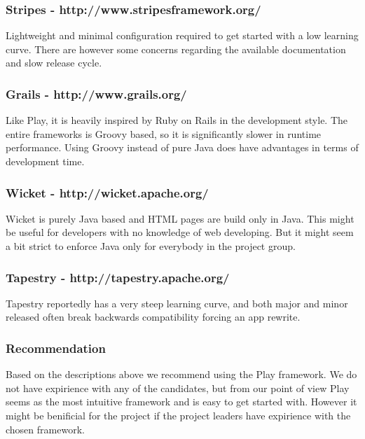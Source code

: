 \documentclass{acm_proc_article-sp}
\begin{document}
\subsubsection*{Stripes - http://www.stripesframework.org/}

Lightweight and minimal configuration required to get started with a low learning curve. There are however some concerns regarding the available documentation and slow release cycle.

\subsubsection*{Grails - http://www.grails.org/}

Like Play, it is heavily inspired by Ruby on Rails in the development style. The entire frameworks is Groovy based, so it is significantly slower in runtime performance. Using Groovy instead of pure Java does have advantages in terms of development time.

\subsubsection*{Wicket - http://wicket.apache.org/}

Wicket is purely Java based and HTML pages are build only in Java. This might be useful for developers with no knowledge of web developing. But it might seem a bit strict to enforce Java only for everybody in the project group.

\subsubsection*{Tapestry - http://tapestry.apache.org/}

Tapestry reportedly has a very steep learning curve, and both major and minor released often break backwards compatibility forcing an app rewrite.

\subsubsection{Recommendation}

Based on the descriptions above we recommend using the Play framework. We do not have expirience with any of the candidates, but from our point of view Play seems as the most intuitive framework and is easy to get started with. However it might be benificial for the project if the project leaders have expirience with the chosen framework.
\end{document}
